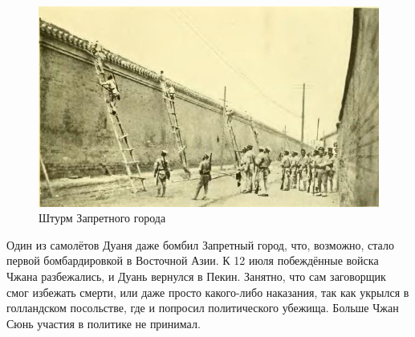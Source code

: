 \begin{figure}[h!tb] 
	\centering\includegraphics[scale=0.6]{Glava4/yj5aMs32FGM.jpg}
	\caption{Штурм Запретного города}%
\end{figure}

Один из самолётов Дуаня даже бомбил Запретный город, что, возможно, стало первой бомбардировкой в Восточной Азии. К 12 июля побеждённые войска Чжана разбежались, и Дуань вернулся в Пекин. Занятно, что сам заговорщик смог избежать смерти, или даже просто какого-либо наказания, так как укрылся в голландском посольстве, где и попросил политического убежища. Больше Чжан Сюнь участия в политике не принимал.


